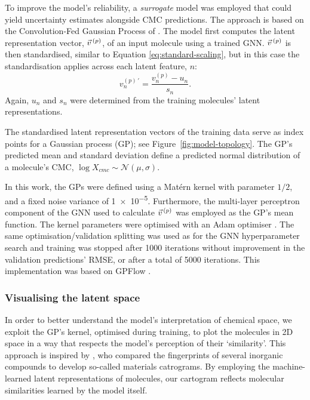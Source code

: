 To improve the model's reliability, a \emph{surrogate} model was employed that could yield uncertainty estimates alongside CMC predictions. The approach is based on the Convolution-Fed Gaussian Process of \citet{tranMethodsComparingUncertainty2020}. The model first computes the latent representation vector, $\vec{v}^{\,(p)}{}$, of an input molecule using a trained GNN. $\vec{v}^{\,(p)}{}$ is then standardised, similar to Equation \ref{eq:standard-scaling},
but in this case the standardisation applies across each latent feature, $n$:
\begin{equation}
    v^{(p)\,\prime}_n = \frac{v^{(p)}_n - u_n}{s_n}.
\end{equation}
Again, $u_n$ and $s_n$ were determined from the training molecules' latent representations.

The standardised latent representation vectors of the training data serve as index points for a Gaussian process (GP); see Figure~\ref{fig:model-topology}.
The GP's predicted mean and standard deviation define a predicted normal distribution of a molecule's CMC, $\log X_{cmc} \sim \mathcal{N}(\mu, \sigma)$.

In this work, the GPs  were defined using a Mat\'ern kernel with parameter $1/2$, and a fixed noise variance of \num{1e-5}. Furthermore, the multi-layer perceptron component of the GNN used to calculate $\vec{v}^{\,(p)}{}$ was employed as the GP's mean function.
The kernel parameters were optimised with an Adam optimiser \cite{kingmaAdamMethodStochastic2017}.
The same optimisation/validation splitting was used as for the GNN hyperparameter search and training was stopped after \num{1000} iterations without improvement in the validation predictions' RMSE, or after a total of \num{5000} iterations. This implementation was based on GPFlow \cite{matthewsGPflowGaussianProcess2017}.

\subsubsection{Visualising the latent space}

In order to better understand the model's interpretation of chemical space, we
exploit the GP's kernel, optimised during training, to plot the molecules in 2D
space in a way that respects the model's perception of their `similarity'. This
approach is inspired by \citet{isayevMaterialsCartographyRepresenting2015}, who
compared the fingerprints of several inorganic compounds to develop so-called
materials catrograms. By employing the machine-learned latent representations of
molecules, our cartogram reflects molecular similarities learned by the model
itself.

